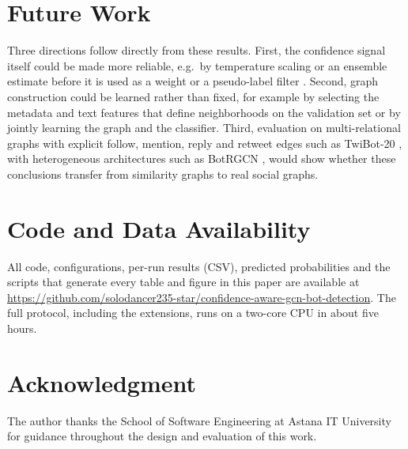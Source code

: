 \documentclass[conference]{IEEEtran}
\begin{document}
\section{Future Work}
Three directions follow directly from these results. First, the confidence signal itself could be made more reliable, e.g.\ by temperature scaling or an ensemble estimate before it is used as a weight or a pseudo-label filter \cite{guo2017calibration}. Second, graph construction could be learned rather than fixed, for example by selecting the metadata and text features that define neighborhoods on the validation set or by jointly learning the graph and the classifier. Third, evaluation on multi-relational graphs with explicit follow, mention, reply and retweet edges such as TwiBot-20 \cite{feng2021twibot20}, with heterogeneous architectures such as BotRGCN \cite{feng2021botrgcn}, would show whether these conclusions transfer from similarity graphs to real social graphs.

\section*{Code and Data Availability}
All code, configurations, per-run results (CSV), predicted probabilities and the scripts that generate every table and figure in this paper are available at \url{https://github.com/solodancer235-star/confidence-aware-gcn-bot-detection}. The full protocol, including the extensions, runs on a two-core CPU in about five hours.

\section*{Acknowledgment}
The author thanks the School of Software Engineering at Astana IT University for guidance throughout the design and evaluation of this work.
\end{document}
